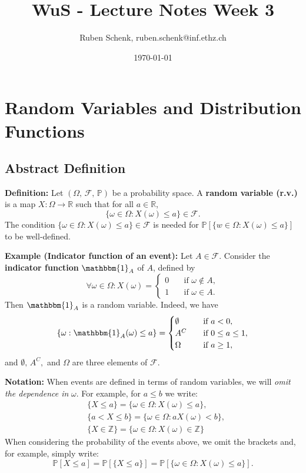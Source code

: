 \documentclass[a4paper]{extarticle}
\title{WuS - Lecture Notes Week 3}
\author{Ruben Schenk, ruben.schenk@inf.ethz.ch}
\date{\today}
\begin{document}
\maketitle
\newpage

\section{Random Variables and Distribution Functions}

\subsection{Abstract Definition}

\textbf{Definition:} Let \((\Omega, \, \mathcal{F}, \, \mathbb{P})\) be a probability space. A \textbf{random variable (r.v.)} is a map \(X : \Omega \to \mathbb{R}\) such that for all \(a \in \mathbb{R}\),
\[
    \{\omega \in \Omega : X(\omega) \leq a\} \in \mathcal{F}.
\]
The condition \(\{\omega \in \Omega : X(\omega) \leq a\} \in \mathcal{F}\) is needed for \(\mathbb{P}[\{w \in \Omega : X(\omega) \leq a\}]\) to be well-defined.

\begin{ebox}
    \textbf{Example (Indicator function of an event):} Let \(A \in \mathcal{F}\). Consider the \textbf{indicator function} \(\mathbbm{1}_A\) of \(A\), defined by
    \[
        \forall \omega \in \Omega : X(\omega) = \begin{cases}
            0 \quad &\text{if } \omega \notin A, \\
            1 \quad &\text{if } \omega \in A.
        \end{cases}
    \]
    Then \(\mathbbm{1}_A\) is a random variable. Indeed, we have
    \[
        \{\omega : \mathbbm{1}_A(\omega) \leq a\} = \begin{cases}
            \emptyset \quad &\text{if } a < 0, \\
            A^C \quad &\text{if } 0 \leq a \leq 1, \\
            \Omega \quad &\text{if } a \geq 1,
        \end{cases}
    \]
    and \(\emptyset, \, A^C,\) and \(\Omega\) are three elements of \(\mathcal{F}\).
\end{ebox}

\textbf{Notation:} When events are defined in terms of random variables, we will \textit{omit the dependence in} \(\omega\). For example, for \(a \leq b\) we write:
\begin{align*}
    &\{X \leq a\} = \{\omega \in \Omega : X(\omega) \leq a\},\\
    &\{a < X \leq b\} = \{\omega \in \Omega : a X(\omega) < b\},\\
    &\{X \in \mathbb{Z}\} = \{\omega \in \Omega : X(\omega) \in \mathbb{Z}\}
\end{align*}
When considering the probability of the events above, we omit the brackets and, for example, simply write:
\[
    \mathbb{P}[X \leq a] = \mathbb{P}[\{X \leq a\}] = \mathbb{P}[\{\omega \in \Omega : X(\omega) \leq a\}].
\]
\end{document}
